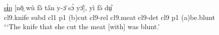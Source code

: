 \documentclass[10pt,twoside]{article}
\newcommand{\gl}[1]{`#1'}
\def\VSP{\vspace{0pt}}
\newcommand{\cl}[1]{{\sc cl#1}}
\def\elicited{$^\diamond$}
\begin{document}
\begin{exe}
%
	\ex \label{exTheKnifeThatSheCut}	
		\gll \uline{sɨ̀ŋ} [nō̤ wù fə̌ ta̋n y-ɔ̄ sɔ̀ yɔ̄], yì fə̌ dṳ᷆	\\
		\cl9.knife {\sc subd} \cl1  {\sc p1} ({\sc b})cut \cl9-{\sc rel} \cl9.meat \cl9-{\sc det} \cl9  {\sc p1} ({\sc a})be.blunt	\\
		\glt \VSP \elicited \gl{The knife that she cut the meat [with] was blunt.}

\end{exe}
\end{document}
